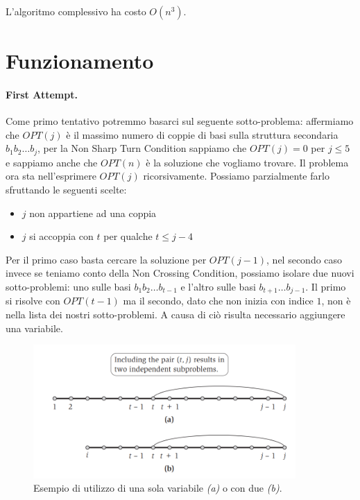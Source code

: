 L'algoritmo complessivo ha costo $O(n^3)$.

\section{Funzionamento}

\paragraph{First Attempt.}
Come primo tentativo potremmo basarci sul seguente sotto-problema: affermiamo che
$OPT(j)$ è il massimo numero di coppie di basi sulla struttura secondaria $b_1
    b_2 \ldots b_j$, per la Non Sharp Turn Condition sappiamo che $OPT(j) = 0$ per
$j \leq 5$ e sappiamo anche che $OPT(n)$ è la soluzione che vogliamo trovare. Il
problema ora sta nell'esprimere $OPT(j)$ ricorsivamente. Possiamo parzialmente
farlo sfruttando le seguenti scelte:

\begin{itemize}
    \item $j$ non appartiene ad una coppia
    \item $j$ si accoppia con $t$ per qualche $t \leq
              j - 4$
\end{itemize}

Per il primo caso basta cercare la soluzione per $OPT(j - 1)$, nel secondo caso
invece se teniamo conto della Non Crossing Condition, possiamo isolare due nuovi
sotto-problemi: uno sulle basi $b_1 b_2 \ldots b_{t-1}$ e l'altro sulle basi
$b_{t+1} \ldots b_{j-1}$. Il primo si risolve con $OPT(t-1)$ ma il secondo, dato
che non inizia con indice $1$, non è nella lista dei nostri sotto-problemi. A
causa di ciò risulta necessario aggiungere una variabile.

\begin{figure}[H]
    \centering
    \includegraphics[width=10cm, keepaspectratio]{capitoli/imgs/rna_funzionamento.png}
    \caption{Esempio di
        utilizzo di una sola variabile \textit{(a)} o con due \textit{(b)}.}
\end{figure}

